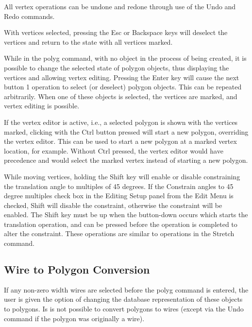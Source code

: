 All vertex operations can be undone and redone through use of the {\cb
Undo} and {\cb Redo} commands.

With vertices selected, pressing the {\kb Esc} or {\kb Backspace} keys
will deselect the vertices and return to the state with all vertices
marked.

While in the {\cb polyg} command, with no object in the process of
being created, it is possible to change the selected state of polygon
objects, thus displaying the vertices and allowing vertex editing. 
Pressing the {\kb Enter} key will cause the next button 1 operation to
select (or deselect) polygon objects.  This can be repeated
arbitrarily.  When one of these objects is selected, the vertices are
marked, and vertex editing is possible.

If the vertex editor is active, i.e., a selected polygon is shown with
the vertices marked, clicking with the {\cb Ctrl} button pressed will
start a new polygon, overriding the vertex editor.  This can be used
to start a new polygon at a marked vertex location, for example. 
Without {\cb Ctrl} pressed, the vertex editor would have precedence
and would select the marked vertex instead of starting a new polygon.

While moving vertices, holding the {\kb Shift} key will enable or
disable constraining the translation angle to multiples of 45 degrees. 
If the {\cb Constrain angles to 45 degree multiples} check box in the
{\cb Editing Setup} panel from the {\cb Edit Menu} is checked, {\kb
Shift} will disable the constraint, otherwise the constraint will be
enabled.  The {\kb Shift} key must be up when the button-down occurs
which starts the translation operation, and can be pressed before the
operation is completed to alter the constraint.  These operations are
similar to operations in the {\cb Stretch} command.

\subsection{Wire to Polygon Conversion}

If any non-zero width wires are selected before the {\cb polyg}
command is entered, the user is given the option of changing the
database representation of these objects to polygons.  Is is not
possible to convert polygons to wires (except via the {\cb Undo}
command if the polygon was originally a wire).


